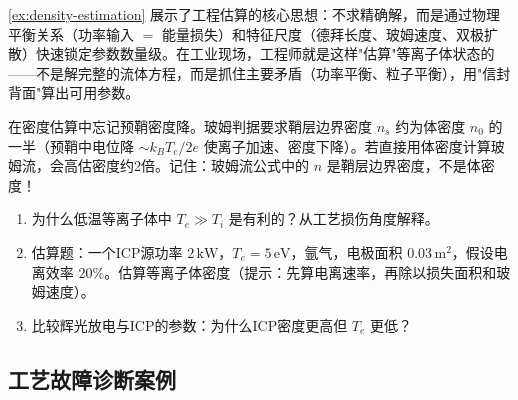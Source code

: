 \documentclass[12pt,a4paper,openany,oneside]{book}
\begin{document}
\begin{insight}{}{}
\cref{ex:density-estimation} 展示了工程估算的核心思想：不求精确解，而是通过物理平衡关系（功率输入 $=$ 能量损失）和特征尺度（德拜长度、玻姆速度、双极扩散）快速锁定参数数量级。在工业现场，工程师就是这样"估算"等离子体状态的——不是解完整的流体方程，而是抓住主要矛盾（功率平衡、粒子平衡），用"信封背面"算出可用参数。
\end{insight}

\begin{warning}{}{}
在密度估算中忘记预鞘密度降。玻姆判据要求鞘层边界密度 $n_s$ 约为体密度 $n_0$ 的一半（预鞘中电位降 $\sim k_B T_e/2e$ 使离子加速、密度下降）。若直接用体密度计算玻姆流，会高估密度约2倍。记住：玻姆流公式中的 $n$ 是鞘层边界密度，不是体密度！
\end{warning}

\begin{miniquiz}
\begin{enumerate}
\item 为什么低温等离子体中 $T_e \gg T_i$ 是有利的？从工艺损伤角度解释。
\item 估算题：一个ICP源功率 $2\,\mathrm{kW}$，$T_e = 5\,\mathrm{eV}$，氩气，电极面积 $0.03\,\mathrm{m^2}$，假设电离效率 $20\%$。估算等离子体密度（提示：先算电离速率，再除以损失面积和玻姆速度）。
\item 比较辉光放电与ICP的参数：为什么ICP密度更高但 $T_e$ 更低？
\end{enumerate}
\end{miniquiz}



\subsection{工艺故障诊断案例}
\end{document}
